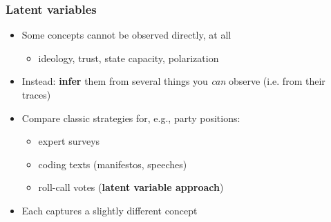 \begin{frame}
\frametitle{Latent variables}
\centering

\begin{itemize}
  \item Some concepts cannot be observed directly, at all
  \begin{itemize}
    \item ideology, trust, state capacity, polarization
  \end{itemize}
  \vspace{8pt}
  \item Instead: \textbf{infer} them from several things you \textit{can} observe (i.e. from their traces)
  \vspace{8pt}
  \item<2-> Compare classic strategies for, e.g., party positions:
  \begin{itemize}
    \item<2-> expert surveys
    \item<2-> coding texts (manifestos, speeches)
    \item<2-> roll-call votes (\textbf{latent variable approach})
  \end{itemize}
  \item<3-> Each captures a slightly different concept
\end{itemize}

\end{frame}

